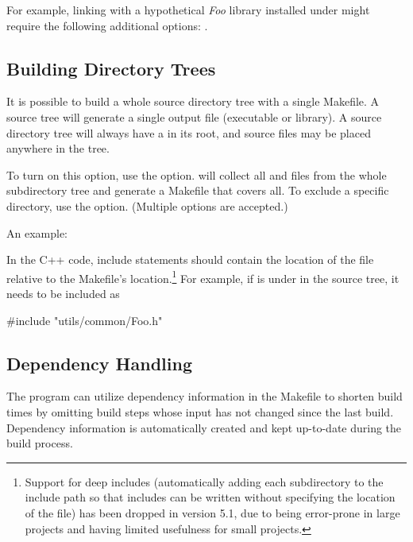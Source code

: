 For example, linking with a hypothetical \textit{Foo} library installed under
 might require the following additional  options:
.


\subsection{Building Directory Trees}
\label{sec:build-sim-progs:building-directory-trees}

It is possible to build a whole source directory tree with a single Makefile.
A source tree will generate a single output file (executable or library).
A source directory tree will always have a  in its root,
and source files may be placed anywhere in the tree.

To turn on this option, use the  option.
 will collect all  and  files from
the whole subdirectory tree and generate a Makefile that covers all.
To exclude a specific directory, use the 
option. (Multiple  options are accepted.)

An example:


In the C++ code, include statements should contain the location of the file
relative to the Makefile's location.\footnote{
  Support for deep includes (automatically adding each subdirectory
  to the include path so that includes can be written without specifying
  the location of the file) has been dropped in {\opp} version 5.1, due to
  being error-prone in large projects and having limited usefulness for
  small projects.}
For example, if  is under  in the source
tree, it needs to be included as

\begin{cpp}
#include "utils/common/Foo.h"
\end{cpp}


\subsection{Dependency Handling}
\label{sec:build-sim-progs:dependency-handling}

The  program can utilize dependency information in the Makefile
to shorten build times by omitting build steps whose input has not changed
since the last build. Dependency information is automatically created and kept
up-to-date during the build process.


